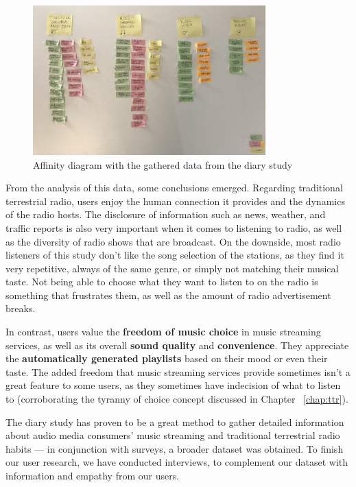 \begin{figure}[h]
\centering
\includegraphics[width=0.8\textwidth]{./Images/affinitydiagram.jpg}
\caption{Affinity diagram with the gathered data from the diary study}
\label{fig:diagram1}
\end{figure}


From the analysis of this data, some conclusions emerged. Regarding traditional terrestrial radio, users enjoy the human connection it provides and the dynamics of the radio hosts. The disclosure of information such as news, weather, and traffic reports is also very important when it comes to listening to radio, as well as the diversity of radio shows that are broadcast. On the downside, most radio listeners of this study don't like the song selection of the stations, as they find it very repetitive, always of the same genre, or simply not matching their musical taste. Not being able to choose what they want to listen to on the radio is something that frustrates them, as well as the amount of radio advertisement breaks.

In contrast, users value the \textbf{freedom of music choice} in music streaming services, as well as its overall \textbf{sound quality} and \textbf{convenience}. They appreciate the \textbf{automatically generated playlists} based on their mood or even their taste. The added freedom that music streaming services provide sometimes isn't a great feature to some users, as they sometimes have indecision of what to listen to (corroborating the tyranny of choice concept discussed in Chapter ~\ref{chap:ttr}). 

The diary study has proven to be a great method to gather detailed information about audio media consumers' music streaming and traditional terrestrial radio habits — in conjunction with surveys, a broader dataset was obtained. To finish our user research, we have conducted interviews, to complement our dataset with information and empathy from our users.

